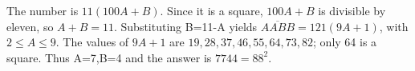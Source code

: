 The number is $11(100A+B)$. Since it is a square, $100A+B$ is divisible by eleven, so $A+B=11$. Substituting B=11-A yields $\overline{AABB}=121(9A+1)$, with $2\le A\le9$. The values of $9A+1$ are $19,28,37,46,55,64,73,82$; only 64 is a square. Thus A=7,B=4 and the answer is $\boxed{7744=88^2}$.
